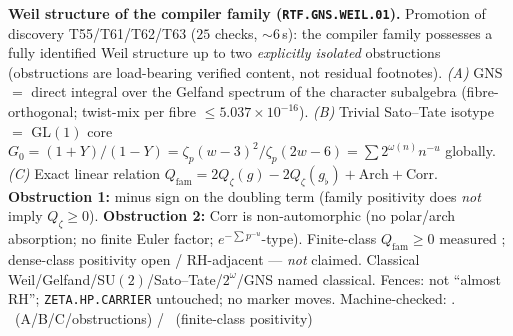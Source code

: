 \par\smallskip\noindent\textbf{Weil structure of the compiler family
(\texttt{RTF.GNS.WEIL.01}).}
Promotion of discovery T55/T61/T62/T63 ($25$ checks, $\sim6$\,s): the compiler family
possesses a fully identified Weil structure up to two \emph{explicitly isolated}
obstructions (obstructions are load-bearing verified content, not residual footnotes).
\emph{(A)} GNS $=$ direct integral over the Gelfand spectrum of the character subalgebra
(fibre-orthogonal; twist-mix per fibre $\le5.037\times10^{-16}$).
\emph{(B)} Trivial Sato--Tate isotype $=$ GL$(1)$ core
$G_0=(1+Y)/(1-Y)=\zeta_p(w-3)^2/\zeta_p(2w-6)=\sum 2^{\omega(n)}n^{-u}$ globally.
\emph{(C)} Exact linear relation
$Q_{\mathrm{fam}}=2Q_\zeta(g)-2Q_\zeta(g_\flat)+\mathrm{Arch}+\mathrm{Corr}$.
\textbf{Obstruction 1:} minus sign on the doubling term
(family positivity does \emph{not} imply $Q_\zeta\ge0$).
\textbf{Obstruction 2:} Corr is non-automorphic
(no polar/arch absorption; no finite Euler factor; $e^{-\sum p^{-u}}$-type).
Finite-class $Q_{\mathrm{fam}}\ge0$ measured \mC; dense-class positivity open /
RH-adjacent --- \emph{not} claimed. Classical Weil/Gelfand/SU$(2)$/Sato--Tate/$2^\omega$/GNS
named classical. Fences: not ``almost RH''; \texttt{ZETA.HP.CARRIER} untouched;
no marker moves.
Machine-checked: .
\mE\ (A/B/C/obstructions) / \mC\ (finite-class positivity)


